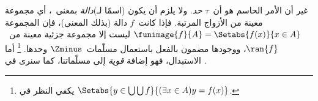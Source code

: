 \documentclass[../../../include/open-logic-section]{subfiles}
\begin{document}
غير أن الأمر الحاسم هو أن~$\tau$ \emph{حد}. ولا يلزم أن يكون (اسمًا
لـ)\emph{دالة} بمعنى~، أي مجموعة معينة من
الأزواج المرتبة. فإذا كانت~$f$ دالة (بذلك المعنى)، فإن المجموعة
$\funimage{f}{A} = \Setabs{f(x)}{x \in A}$ ليست إلا مجموعة جزئية
معينة من~$\ran{f}$، ووجودها مضمون بالفعل باستعمال مسلّمات~$\Zminus$
وحدها.
\footnote{يكفي النظر في
$\Setabs{y \in \bigcup \bigcup f}{(\exists x \in A)y = f(x)}$.}
أما الاستبدال، فهو إضافة \emph{قوية} إلى مسلّماتنا، كما سنرى في
.
\end{document}
